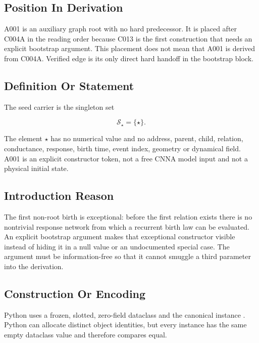 \subsection{Position In Derivation}\label{position-in-derivation-5}

A001 is an auxiliary graph root with no hard predecessor. It is placed
after C004A in the reading order because C013 is the first construction
that needs an explicit bootstrap argument. This placement does not mean
that A001 is derived from C004A. Verified edge
\texttt{\protect{}} is its only direct hard
handoff in the bootstrap block.

\subsection{Definition Or Statement}\label{definition-or-statement-3}

The seed carrier is the singleton set

\[
\mathcal S_\star=\{\star\}.
\]

The element \(\star\) has no numerical value and no address, parent,
child, relation, conductance, response, birth time, event index,
geometry or dynamical field. A001 is an explicit constructor token, not
a free CNNA model input and not a physical initial state.

\subsection{Introduction Reason}\label{introduction-reason-8}

The first non-root birth is exceptional: before the first relation
exists there is no nontrivial response network from which a recurrent
birth law can be evaluated. An explicit bootstrap argument makes that
exceptional constructor visible instead of hiding it in a null value or
an undocumented special case. The argument must be information-free so
that it cannot smuggle a third parameter into the derivation.

\subsection{Construction Or Encoding}\label{construction-or-encoding-3}

Python uses a frozen, slotted, zero-field dataclass \texttt{\protect{}}
and the canonical instance \texttt{\protect{}}. Python can allocate
distinct object identities, but every instance has the same empty
dataclass value and therefore compares equal.

